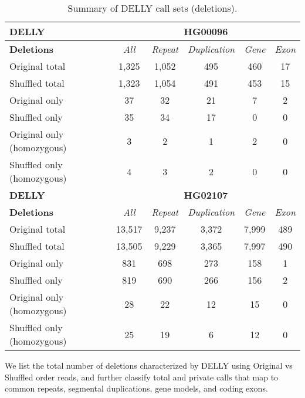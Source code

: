 \begin{table}[htb]
\caption{ Summary of DELLY call sets (deletions). }
\begin{center}
\begin{tabular}{|l|c||c|c|c|c|}
\hline
{\bf DELLY} & \multicolumn{5}{|c|}{\bf HG00096} \\
\hline
\cline{2-6}
{\bf Deletions} & {\it All} & {\it Repeat} & {\it Duplication} & {\it Gene} & {\it Exon} \\
\hline
Original total & 1,325 & 1,052 & 495 & 460 & 17\\ 
\hline
Shuffled total & 1,323 & 1,054 & 491 & 453 & 15\\ 
\hline
Original only & 37 & 32 & 21 & 7 & 2\\ 
\hline
Shuffled only & 35 & 34 & 17 & 0 & 0\\ 
\hline
Original only (homozygous) & 3 & 2 & 1 & 2 & 0\\ 
\hline
Shuffled only (homozygous) & 4 & 3 & 2 & 0 & 0\\ 
\hline
\hline
{\bf DELLY} & \multicolumn{5}{|c|}{\bf HG02107} \\
\hline
\cline{2-6}
{\bf Deletions} & {\it All} & {\it Repeat} & {\it Duplication} & {\it Gene} & {\it Exon} \\
\hline
Original total & 13,517 & 9,237 & 3,372 & 7,999 & 489\\ 
\hline
Shuffled total & 13,505 & 9,229 & 3,365 & 7,997 & 490\\ 
\hline
Original only & 831 & 698 & 273 & 158 & 1\\ 
\hline
Shuffled only & 819 & 690 & 266 & 156 & 2\\ 
\hline
Original only (homozygous) & 28 & 22 & 12 & 15 & 0\\ 
\hline
Shuffled only (homozygous) & 25 & 19 & 6 & 12 & 0\\ 
\hline
\end{tabular}
\end{center}
{\footnotesize We list the total number of deletions characterized by DELLY using Original vs Shuffled order reads, 
and further classify total and private calls that map to common repeats, segmental duplications, gene models, and coding exons.}
\label{supptab:orig-vs-shuf-delly-deletions}
\end{table}

